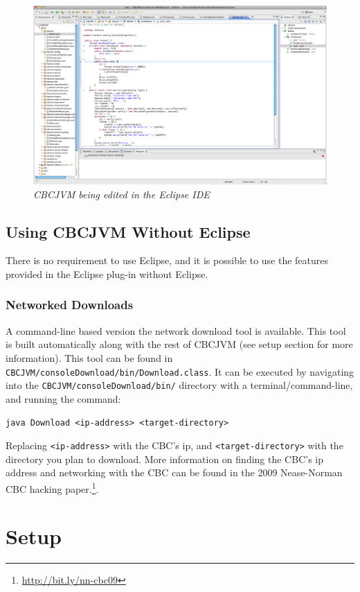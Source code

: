 \documentclass[12pt,letterpaper]{article}
\newcommand{\urlfootnote}[1]{\footnote{\url{#1}}}
\newcommand{\code}[1]{\par\texttt{#1}\par}
\begin{document}
\begin{figure}[H]
\includegraphics[width=\textwidth]{eclipse.png}
\caption{\textit{CBCJVM being edited in the Eclipse IDE}}
\end{figure}


\subsection{Using CBCJVM Without Eclipse}

There is no requirement to use Eclipse, and it is possible to use the features provided in the Eclipse plug-in without Eclipse.



\subsubsection{Networked Downloads}

A command-line based version the network download tool is available. This tool is built automatically along with the rest of CBCJVM (see setup section for more information). This tool can be found in \texttt{CBCJVM/\-consoleDownload/\-bin/\-Download.\-class}. It can be executed by navigating into the \texttt{CBCJVM/\-consoleDownload/\-bin/} directory with a terminal/command-line, and running the command: \code{java Download <ip-address> <target-directory>} Replacing \texttt{<ip-address>} with the CBC's ip, and \texttt{<target-directory>} with the directory you plan to download. More information on finding the CBC's ip address and networking with the CBC can be found in the 2009 Nease-Norman CBC hacking paper.\urlfootnote{http://bit.ly/nn-cbc09}.



\pagebreak
\section{Setup}
\end{document}
